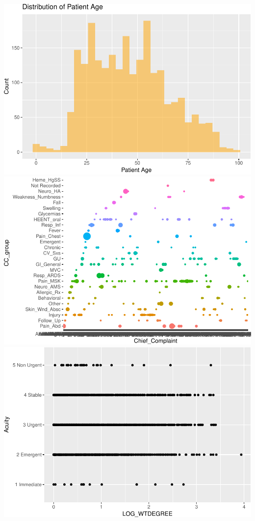 \documentclass[]{elsarticle} %
\makeatletter
\def\maxwidth{\ifdim\Gin@nat@width>\linewidth\linewidth
\else\Gin@nat@width\fi}
\let\Oldincludegraphics\includegraphics
\renewcommand{\includegraphics}[1]{\Oldincludegraphics[width=\maxwidth]{#1}}
\makeatother
\begin{document}
\includegraphics{Flynn_Project_files/figure-latex/Participants-4.pdf}
\includegraphics{Flynn_Project_files/figure-latex/Participants-5.pdf}
\includegraphics{Flynn_Project_files/figure-latex/Participants-6.pdf}
\end{document}
